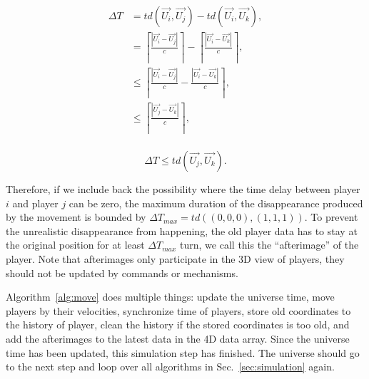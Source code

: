 \documentclass{article}
\begin{document}
\begin{align*}
  \Delta T &= td(\overrightarrow{U_i}, \overrightarrow{U_j}) - td(\overrightarrow{U_i}, \overrightarrow{U_k}), \\
  &= \left \lceil \frac{|\overrightarrow{U_i} - \overrightarrow{U_j}|}{c} \right \rceil - \left \lceil \frac{|\overrightarrow{U_i} - \overrightarrow{U_k}|}{c} \right \rceil,  \\
  &\leq \left \lceil \frac{|\overrightarrow{U_i} - \overrightarrow{U_j}|}{c} - \frac{|\overrightarrow{U_i} - \overrightarrow{U_k}|}{c} \right \rceil, \\
  &\leq \left \lceil \frac{|\overrightarrow{U_j} - \overrightarrow{U_k}|}{c} \right \rceil, \\
\end{align*}

\begin{equation} \label{eq:deltaT}
  \Delta T \leq td(\overrightarrow{U_j}, \overrightarrow{U_k}).
\end{equation}

Therefore, if we include back the possibility where the time delay between player $i$ and player $j$ can be zero,
the maximum duration of the disappearance produced by the movement is bounded by $\Delta T_{max} = td((0, 0, 0), (1, 1, 1))$.
To prevent the unrealistic disappearance from happening, the old player data has to stay at the original
position for at least $\Delta T_{max}$ turn, we call this the ``afterimage'' of the player.
Note that afterimages only participate in the 3D view of players, they should not be updated by commands or mechanisms.

Algorithm~\ref{alg:move} does multiple things: update the universe time, 
move players by their velocities, synchronize time of players,
store old coordinates to the history of player, clean the history if the stored coordinates is too old,
and add the afterimages to the latest data in the 4D data array.
Since the universe time has been updated, this simulation step has finished. 
The universe should go to the next step and loop over all algorithms in Sec.~\ref{sec:simulation} again.
\end{document}
